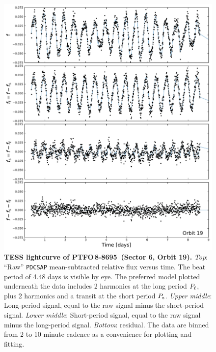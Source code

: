 \documentclass[12pt,twocolumn,tighten]{aastex62}
\newcommand{\ptfo}{PTFO$\,$8-8695}
\begin{document}
\begin{figure}[t!]
	\begin{center}
		\leavevmode
		\includegraphics[width=1\textwidth]{f1.pdf}
	\end{center}
	\vspace{-0.7cm}
	\caption{
		{\bf TESS lightcurve of \ptfo\ (Sector 6, Orbit 19).}
    {\it Top}: ``Raw'' \texttt{PDCSAP} mean-subtracted relative flux
    versus time. The beat period of 4.48 days is visible by eye.  The
    preferred model plotted underneath the data includes 2 harmonics
    at the long period $P_{\rm \ell}$, plus 2 harmonics and a transit
    at the short period $P_{\rm s}$.
		{\it Upper middle}: Long-period signal, equal to the raw signal
		minus the short-period signal.
		{\it Lower middle}: Short-period signal, equal to the raw signal
		minus the long-period signal.
		{\it Bottom}: residual.  The data are binned from 2 to 10 minute
		cadence as a convenience for plotting and fitting.
		\label{fig:splitsignal}
	}
\end{figure}
\end{document}
